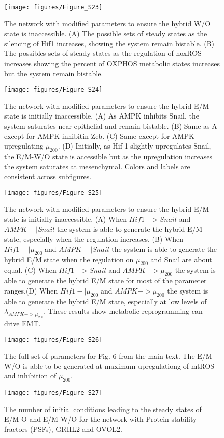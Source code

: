 \documentclass{article}
\begin{document}
\begin{figure}
\texttt{[image: figures/Figure\_S23]}
\caption{The network with modified parameters to ensure the hybrid W/O state is inaccessible. (A) The possible sets of steady states as the silencing of Hif1 increases, showing the system remain bistable. (B) The possibles sets of  steady states as the regulation of noxROS increases showing the percent of OXPHOS metabolic states increases but the system remain bistable. }
\end{figure}
\begin{figure}
\texttt{[image: figures/Figure\_S24]}
\caption{The network with modified parameters to ensure the hybrid E/M state is initially inaccessible. (A) As AMPK inhibits Snail, the system saturates near epithelial and remain bistable. (B) Same as A except for AMPK inhibitin Zeb. (C)  Same except for AMPK upregulating $\mu_{200}$. (D) Initially, as Hif-1 slightly upregulates Snail, the E/M-W/O state is accessible but as the upregulation increases the system saturates at mesenchymal. Colors and labels are consistent across subfigures.}
\end{figure}

\begin{figure}
\texttt{[image: figures/Figure\_S25]}
\caption{The network with modified parameters to ensure the hybrid E/M state is initially inaccessible. (A) When $Hif1 -> Snail$ and $AMPK-| Snail$ the system is able to generate the hybrid E/M state, especially when the regulation increases. (B)  When $Hif1 -| \mu_{200}$ and $AMPK-| Snail$ the system is able to generate the hybrid E/M state when the regulation on $\mu_{200}$ and Snail are about equal. (C)  When $Hif1 -> Snail$ and $AMPK-> \mu_{200}$ the system is able to generate the hybrid E/M state for most of the parameter ranges.(D)  When $Hif1 -| \mu_{200}$ and $AMPK-> \mu_{200}$ the system is able to generate the hybrid E/M state, especially at low levels of $\lambda_{AMPK-> \mu_{200}}$. These results show metabolic reprogramming can drive EMT. }
\end{figure}

\begin{figure}
\texttt{[image: figures/Figure\_S26]}
\caption{The full set of parameters for Fig. 6 from the main text. The E/M-W/O is able to be generated at maximum upregulationg of mtROS and inhibition of $\mu_{200}$. }
\end{figure}

\begin{figure}
\texttt{[image: figures/Figure\_S27]}
\caption{The number of initial conditions leading to the steady states of E/M-O and E/M-W/O for the network with Protein stability fractors (PSFs), GRHL2 and OVOL2.}
\end{figure}
\end{document}
